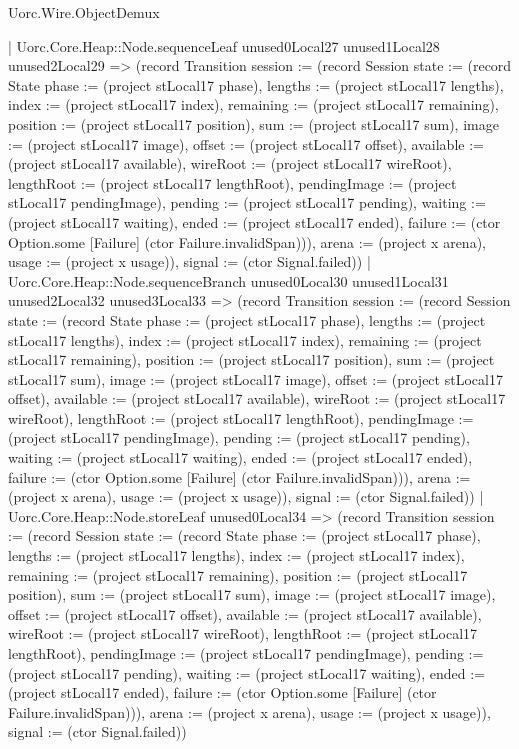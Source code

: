 \begin{lexlean}{Uorc.Wire.ObjectDemux}
\begin{semanticmodule}
{        | Uorc.Core.Heap::Node.sequenceLeaf unused0Local27 unused1Local28 unused2Local29 => (record Transition {session := (record Session {state := (record State {phase := (project stLocal17 phase), lengths := (project stLocal17 lengths), index := (project stLocal17 index), remaining := (project stLocal17 remaining), position := (project stLocal17 position), sum := (project stLocal17 sum), image := (project stLocal17 image), offset := (project stLocal17 offset), available := (project stLocal17 available), wireRoot := (project stLocal17 wireRoot), lengthRoot := (project stLocal17 lengthRoot), pendingImage := (project stLocal17 pendingImage), pending := (project stLocal17 pending), waiting := (project stLocal17 waiting), ended := (project stLocal17 ended), failure := (ctor Option.some [Failure] (ctor Failure.invalidSpan))}), arena := (project x arena), usage := (project x usage)}), signal := (ctor Signal.failed)})
        | Uorc.Core.Heap::Node.sequenceBranch unused0Local30 unused1Local31 unused2Local32 unused3Local33 => (record Transition {session := (record Session {state := (record State {phase := (project stLocal17 phase), lengths := (project stLocal17 lengths), index := (project stLocal17 index), remaining := (project stLocal17 remaining), position := (project stLocal17 position), sum := (project stLocal17 sum), image := (project stLocal17 image), offset := (project stLocal17 offset), available := (project stLocal17 available), wireRoot := (project stLocal17 wireRoot), lengthRoot := (project stLocal17 lengthRoot), pendingImage := (project stLocal17 pendingImage), pending := (project stLocal17 pending), waiting := (project stLocal17 waiting), ended := (project stLocal17 ended), failure := (ctor Option.some [Failure] (ctor Failure.invalidSpan))}), arena := (project x arena), usage := (project x usage)}), signal := (ctor Signal.failed)})
        | Uorc.Core.Heap::Node.storeLeaf unused0Local34 => (record Transition {session := (record Session {state := (record State {phase := (project stLocal17 phase), lengths := (project stLocal17 lengths), index := (project stLocal17 index), remaining := (project stLocal17 remaining), position := (project stLocal17 position), sum := (project stLocal17 sum), image := (project stLocal17 image), offset := (project stLocal17 offset), available := (project stLocal17 available), wireRoot := (project stLocal17 wireRoot), lengthRoot := (project stLocal17 lengthRoot), pendingImage := (project stLocal17 pendingImage), pending := (project stLocal17 pending), waiting := (project stLocal17 waiting), ended := (project stLocal17 ended), failure := (ctor Option.some [Failure] (ctor Failure.invalidSpan))}), arena := (project x arena), usage := (project x usage)}), signal := (ctor Signal.failed)})
}
\end{semanticmodule}
\end{lexlean}
